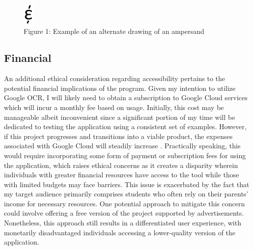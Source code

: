 \documentclass[10pt,twocolumn]{article}
\begin{document}
\begin{figure}[htbp]
    \centering
    \includegraphics[width=0.05\textwidth]{Epsilon_Ampersand.png}
    \caption{Figure 1: Example of an alternate drawing of an ampersand\cite{altAmpersand}}
    \label{fig:image_label}
\end{figure}

\subsection{Financial}
An additional ethical consideration regarding accessibility pertains to the potential financial implications of the program. Given my intention to utilize Google OCR, I will likely need to obtain a subscription to Google Cloud services which will incur a monthly fee based on usage. Initially, this cost may be manageable albeit inconvenient since a significant portion of my time will be dedicated to testing the application using a consistent set of examples. However, if this project progresses and transitions into a viable product, the expenses associated with Google Cloud will steadily increase . Practically speaking, this would require incorporating some form of payment or subscription fees for using the application, which raises ethical concerns as it creates a disparity wherein individuals with greater financial resources have access to the tool while those with limited budgets may face barriers. This issue is exacerbated by the fact that my target audience primarily comprises students who often rely on their parents' income for necessary resources. One potential approach to mitigate this concern could involve offering a free version of the project supported by advertisements. Nonetheless, this approach still results in a differentiated user experience, with monetarily disadvantaged individuals accessing a lower-quality version of the application.
\end{document}
